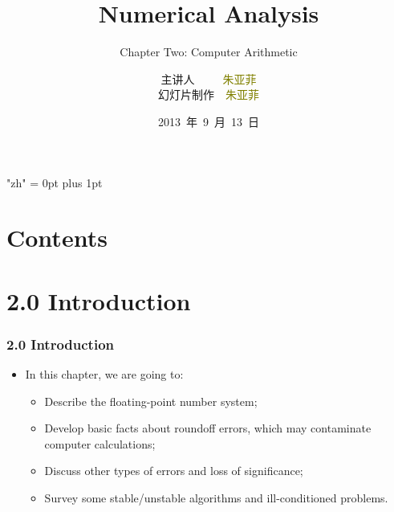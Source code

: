 \documentclass[notheorems,mathserif,table,compress]{beamer}  %
\begin{document}
\XeTeXlinebreaklocale "zh"         %
\XeTeXlinebreakskip = 0pt plus 1pt %


\title[Numerical Analysis]{Numerical Analysis}
\subtitle{Chapter Two: Computer Arithmetic}
\author[zhu]{主讲人~~~~~\textcolor{olive}{朱亚菲}\\
    \quad 幻灯片制作~~\textcolor{olive}{朱亚菲}}
\institute[中国海洋大学]{\small\textcolor{violet}{中国海洋大学~~信息科学与工程学院}}
\date{2013~年~9~月~13~日}
\frame{ \titlepage }
\section*{Contents}



\section{2.0 Introduction}

\begin{frame}
  \frametitle{2.0 Introduction}
  \begin{itemize}
  \item In this  chapter, we are going to:
  \begin{itemize}
  \item Describe the floating-point number system;
  \item Develop basic facts about roundoff errors, which may contaminate computer calculations;
  \item Discuss other types of errors and loss of significance;
  \item Survey some stable/unstable algorithms and ill-conditioned problems.
  \end{itemize}
  \end{itemize}
\end{frame}
\end{document}
